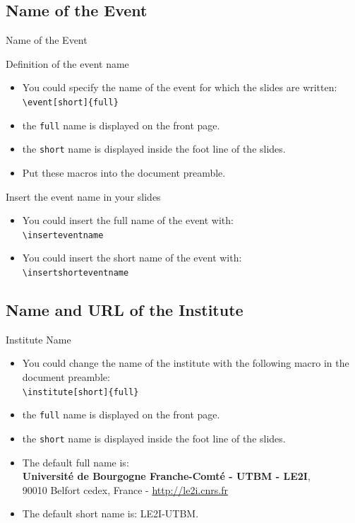 \documentclass[english,sectioncirclenumberstyle]{le2iutbmbeamer}
\begin{document}
\subsection{Name of the Event}

\begin{frame}[t]{Name of the Event}
	\begin{block}{Definition of the event name}
		\begin{itemize}
		\item You could specify the name of the event for which the slides are written: \\
			\texttt{{\textbackslash}event[short]\{full\}}
		\item the \texttt{full} name is displayed on the front page.
		\item the \texttt{short} name is displayed inside the foot line of the slides.
		\item Put these macros into the document preamble.
		\end{itemize}
	\end{block}
	\begin{block}{Insert the event name in your slides}
		\begin{itemize}
		\item You could insert the full name of the event with: \\
			\texttt{{\textbackslash}inserteventname}
		\item You could insert the short name of the event with: \\
			\texttt{{\textbackslash}insertshorteventname}
		\end{itemize}
	\end{block}
\end{frame}

\subsection{Name and URL of the Institute}
\begin{frame}{Institute Name}
	\begin{itemize}
	\item You could change the name of the institute with the following macro in the document preamble: \\
		\texttt{{\textbackslash}institute[short]\{full\}}
	\item the \texttt{full} name is displayed on the front page.
	\item the \texttt{short} name is displayed inside the foot line of the slides.
	\vspace{1em}
	\item The default full name is: \\
		\small\textbf{Universit\'e de Bourgogne Franche-Comt\'e - UTBM - LE2I}, \\
		\small90010 Belfort cedex, France - \url{http://le2i.cnrs.fr}
	\item The default short name is: LE2I-UTBM.
	\end{itemize}
\end{frame}
\end{document}

